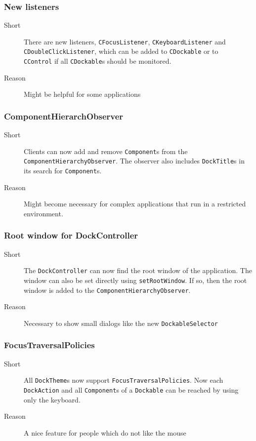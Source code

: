 \documentclass[a4paper,10pt]{article}
\newcommand{\src}[1]{\lstinline[basicstyle=\normalsize\ttfamily,keywordstyle=\normalsize\ttfamily,identifierstyle=\normalsize\ttfamily]|#1|}
\newcommand{\short}{\item[Short]}
\newcommand{\why}{\item[Reason]}
\begin{document}
\subsubsection{New listeners}
\begin{description}
 \short There are new listeners, \src{CFocusListener}, \src{CKeyboardListener} and \\\src{CDoubleClickListener}, which can be added to \src{CDockable} or to \\\src{CControl} if all \src{CDockable}s should be monitored.
 \why Might be helpful for some applications
\end{description}

\subsubsection{ComponentHierarchObserver}
\begin{description}
 \short Clients can now add and remove \src{Component}s from the \\\src{ComponentHierarchyObserver}. The observer also includes \src{DockTitle}s in its search for \src{Component}s.
 \why Might become necessary for complex applications that run in a restricted environment.
\end{description}

\subsubsection{Root window for DockController}
\begin{description}
 \short The \src{DockController} can now find the root window of the application. The window can also be set directly using \src{setRootWindow}. If so, then the root window is added to the \src{ComponentHierarchyObserver}.
 \why Necessary to show small dialogs like the new \src{DockableSelector}
\end{description}

\subsubsection{FocusTraversalPolicies}
\begin{description}
 \short All \src{DockTheme}s now support \src{FocusTraversalPolicies}. Now each \\\src{DockAction} and all \src{Component}s of a \src{Dockable} can be reached by using only the keyboard.
 \why A nice feature for people which do not like the mouse
\end{description}
\end{document}
